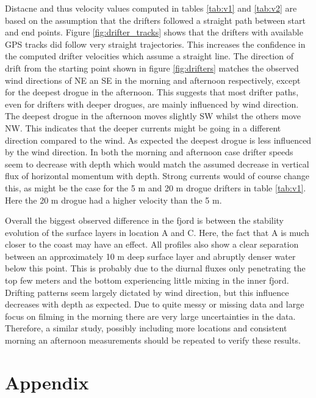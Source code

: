 \documentclass[a4paper,10pt,english]{article}
\begin{document}
Distacne and thus velocity values computed in tables \ref*{tab:v1} and \ref*{tab:v2} are based on the assumption that the drifters followed a straight path between start and end points. Figure \ref*{fig:drifter_tracks} shows that the drifters with available GPS tracks did follow very straight trajectories. This increases the confidence in the computed drifter velocities which assume a straight line. The direction of drift from the starting point shown in figure \ref*{fig:drifters} matches the observed wind directions of NE an SE in the morning and afternoon respectively, except for the deepest drogue in the afternoon. This suggests that most drifter paths, even for drifters with deeper drogues, are mainly influenced by wind direction. The deepest drogue in the afternoon moves slightly SW whilst the others move NW. This indicates that the deeper currents might be going in a different direction compared to the wind. As expected the deepest drogue is less influenced by the wind direction. In both the morning and afternoon case drifter speeds seem to decrease with depth which would match the assumed decrease in vertical flux of horizontal momentum with depth. Strong currents would of course change this, as might be the case for the 5 m and 20 m drogue drifters in table \ref*{tab:v1}. Here the 20 m drogue had a higher velocity than the 5 m.

Overall the biggest observed difference in the fjord is between the stability evolution of the surface layers in location A and C. Here, the fact that A is much closer to the coast may have an effect. All profiles also show a clear separation between an approximately 10 m deep surface layer and abruptly denser water below this point. This is probably due to the diurnal fluxes only penetrating the top few meters and the bottom experiencing little mixing in the inner fjord. Drifting patterns seem largely dictated by wind direction, but this influence decreases with depth as expected. Due to quite messy or missing data and large focus on filming in the morning there are very large uncertainties in the data. Therefore, a similar study, possibly including more locations and consistent morning an afternoon measurements should be repeated to verify these results.

\newpage
\appendix
\section{Appendix}
\end{document}

